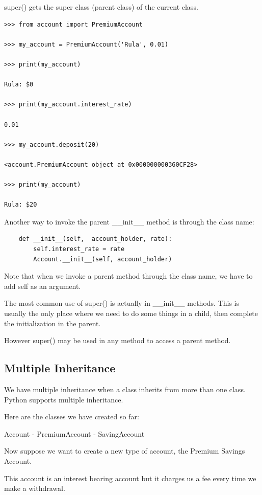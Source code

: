 \documentclass{article}
\begin{document}
super() gets the super class (parent class) of the current class.

\begin{lstlisting}
>>> from account import PremiumAccount

>>> my_account = PremiumAccount('Rula', 0.01)

>>> print(my_account)

Rula: $0

>>> print(my_account.interest_rate)

0.01

>>> my_account.deposit(20)

<account.PremiumAccount object at 0x000000000360CF28>

>>> print(my_account)

Rula: $20
\end{lstlisting}

Another way to invoke the parent {\_}{\_}init{\_}{\_} method is through the class name: 

\begin{lstlisting}
    def __init__(self,  account_holder, rate):
        self.interest_rate = rate
        Account.__init__(self, account_holder)
\end{lstlisting}

Note that when we invoke a parent method through the class name, we have to add self as an argument.

The most common use of super() is actually in {\_}{\_}init{\_}{\_}  methods. This is usually the only place where we need to do some things in a child, then complete the initialization in the parent.   

However super() may be used in any method to access a parent method.

\subsection{Multiple Inheritance}

We have multiple inheritance when a class inherits from more than one class.  Python supports multiple inheritance.

Here are the classes we have created so far:

Account -  PremiumAccount - SavingAccount

Now suppose we want to create a new type of account, the Premium Savings Account.

This account is an interest bearing account but it charges us a fee every time we make a withdrawal.
\end{document}
